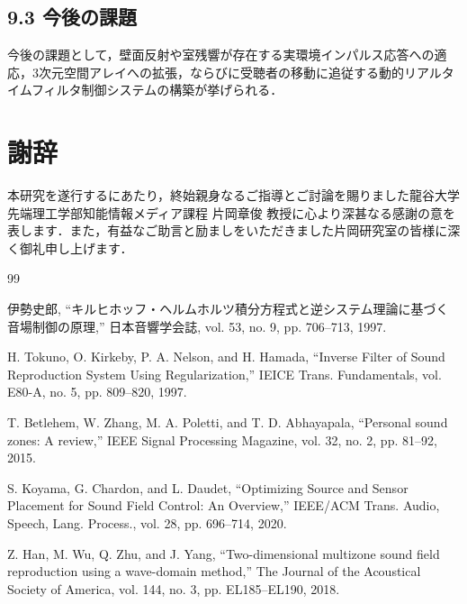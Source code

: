 \documentclass[11pt, a4paper]{article}
\begin{document}
\subsection{9.3 今後の課題}
今後の課題として，壁面反射や室残響が存在する実環境インパルス応答への適応，3次元空間アレイへの拡張，ならびに受聴者の移動に追従する動的リアルタイムフィルタ制御システムの構築が挙げられる．

\section*{謝辞}
本研究を遂行するにあたり，終始親身なるご指導とご討論を賜りました龍谷大学先端理工学部知能情報メディア課程 片岡章俊 教授に心より深甚なる感謝の意を表します．また，有益なご助言と励ましをいただきました片岡研究室の皆様に深く御礼申し上げます．

\begin{thebibliography}{99}
伊勢史郎, ``キルヒホッフ・ヘルムホルツ積分方程式と逆システム理論に基づく音場制御の原理,'' 日本音響学会誌, vol. 53, no. 9, pp. 706--713, 1997.

H. Tokuno, O. Kirkeby, P. A. Nelson, and H. Hamada, ``Inverse Filter of Sound Reproduction System Using Regularization,'' IEICE Trans. Fundamentals, vol. E80-A, no. 5, pp. 809--820, 1997.

T. Betlehem, W. Zhang, M. A. Poletti, and T. D. Abhayapala, ``Personal sound zones: A review,'' IEEE Signal Processing Magazine, vol. 32, no. 2, pp. 81--92, 2015.

S. Koyama, G. Chardon, and L. Daudet, ``Optimizing Source and Sensor Placement for Sound Field Control: An Overview,'' IEEE/ACM Trans. Audio, Speech, Lang. Process., vol. 28, pp. 696--714, 2020.

Z. Han, M. Wu, Q. Zhu, and J. Yang, ``Two-dimensional multizone sound field reproduction using a wave-domain method,'' The Journal of the Acoustical Society of America, vol. 144, no. 3, pp. EL185--EL190, 2018.
\end{thebibliography}

\newpage
\end{document}
